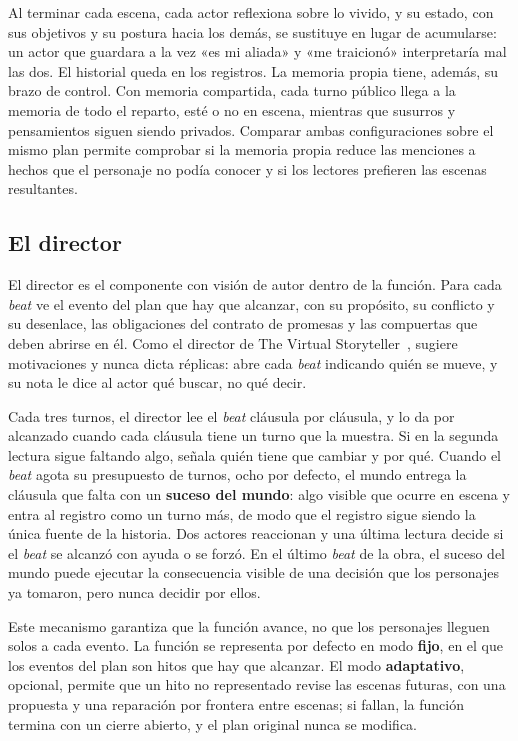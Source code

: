 Al terminar cada escena, cada actor reflexiona sobre lo vivido, y su estado, con sus objetivos y su
postura hacia los demás, se sustituye en lugar de acumularse: un actor que guardara a la vez «es mi
aliada» y «me traicionó» interpretaría mal las dos. El historial queda en los registros. La memoria
propia tiene, además, su brazo de control. Con memoria compartida, cada turno público llega a la
memoria de todo el reparto, esté o no en escena, mientras que susurros y pensamientos siguen siendo
privados. Comparar ambas configuraciones sobre el mismo plan permite comprobar si la memoria propia reduce
las menciones a hechos que el personaje no podía conocer y si los lectores prefieren las escenas resultantes.

\subsection{El director}\label{sec:director}

El director es el componente con visión de autor dentro de la función. Para cada \textit{beat} ve
el evento del plan que hay que alcanzar, con su propósito, su conflicto y su desenlace, las
obligaciones del contrato de promesas y las compuertas que deben abrirse en él. Como el director de
The Virtual Storyteller~\cite{theune2003}, sugiere motivaciones y nunca dicta réplicas: abre cada
\textit{beat} indicando quién se mueve, y su nota le dice al actor qué buscar, no qué decir.

Cada tres turnos, el director lee el \textit{beat} cláusula por cláusula, y lo da por alcanzado
cuando cada cláusula tiene un turno que la muestra. Si en la segunda lectura sigue faltando algo,
señala quién tiene que cambiar y por qué. Cuando el \textit{beat} agota su presupuesto de turnos,
ocho por defecto, el mundo entrega la cláusula que falta con un \textbf{suceso del mundo}: algo
visible que ocurre en escena y entra al registro como un turno más, de modo que el registro sigue
siendo la única fuente de la historia. Dos actores reaccionan y una última lectura decide si el
\textit{beat} se alcanzó con ayuda o se forzó. En el último \textit{beat} de la obra, el suceso del
mundo puede ejecutar la consecuencia visible de una decisión que los personajes ya tomaron, pero
nunca decidir por ellos.

Este mecanismo garantiza que la función avance, no que los personajes lleguen solos a cada evento.
La función se representa por defecto en modo \textbf{fijo}, en el que los eventos del plan son hitos que hay que
alcanzar. El modo \textbf{adaptativo}, opcional, permite que un hito no representado revise las
escenas futuras, con una propuesta y una reparación por frontera entre escenas; si fallan, la función
termina con un cierre abierto, y el plan original nunca se modifica.

